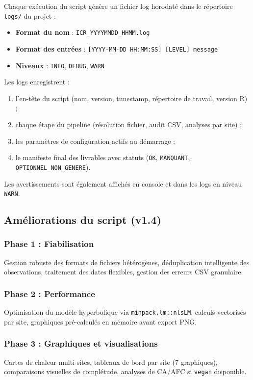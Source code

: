 \documentclass[11pt,a4paper]{article}
\begin{document}
Chaque exécution du script génère un fichier log horodaté dans le répertoire \texttt{logs/} du projet :

\begin{itemize}
  \item \textbf{Format du nom} : \texttt{ICR\_YYYYMMDD\_HHMM.log}
  \item \textbf{Format des entrées} : \texttt{[YYYY-MM-DD HH:MM:SS] [LEVEL] message}
  \item \textbf{Niveaux} : \texttt{INFO}, \texttt{DEBUG}, \texttt{WARN}
\end{itemize}

Les logs enregistrent :
\begin{enumerate}
  \item l'en-tête du script (nom, version, timestamp, répertoire de travail, version R) ;
  \item chaque étape du pipeline (résolution fichier, audit CSV, analyses par site) ;
  \item les paramètres de configuration actifs au démarrage ;
  \item le manifeste final des livrables avec statuts (\texttt{OK}, \texttt{MANQUANT}, \texttt{OPTIONNEL\_NON\_GENERE}).
\end{enumerate}

Les avertissements sont également affichés en console et dans les logs en niveau \texttt{WARN}.

\subsection{Améliorations du script (v1.4)}

\subsubsection{Phase 1 : Fiabilisation}
Gestion robuste des formats de fichiers hétérogènes, déduplication intelligente des observations, traitement des dates flexibles, gestion des erreurs CSV granulaire.

\subsubsection{Phase 2 : Performance}
Optimisation du modèle hyperbolique via \texttt{minpack.lm::nlsLM}, calculs vectorisés par site, graphiques pré-calculés en mémoire avant export PNG.

\subsubsection{Phase 3 : Graphiques et visualisations}
Cartes de chaleur multi-sites, tableaux de bord par site (7 graphiques), comparaisons visuelles de complétude, analyses de CA/AFC si \texttt{vegan} disponible.
\end{document}
